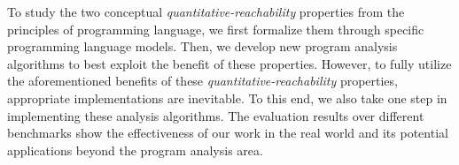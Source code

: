 To study the two conceptual \emph{quantitative-reachability} properties from the principles of programming language, we first formalize them through specific programming language models.
Then, we develop new program analysis algorithms to best exploit the benefit of these properties.
However, to fully utilize the aforementioned benefits
of these \emph{quantitative-reachability} properties, appropriate implementations are inevitable. 
To this end, we also take one step in implementing these analysis algorithms.
The evaluation results over different benchmarks show the effectiveness of our work in the real world and its potential applications beyond the program analysis area.